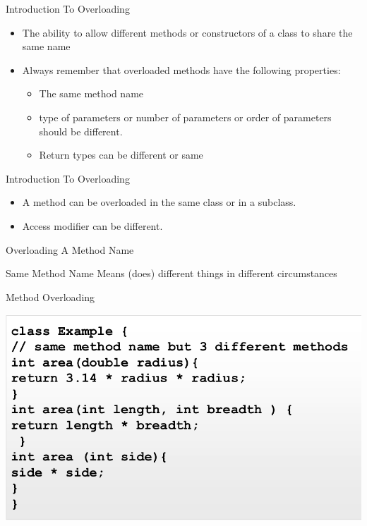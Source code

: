 \documentclass[14pt]{beamer}
\begin{document}
\begin{frame}{Introduction To Overloading}
\begin{itemize}
\item The ability to allow different methods or constructors of a class to share the same name
\item Always remember that overloaded methods have the following properties:
\begin{itemize}
\item The same method name
\item type of parameters or number of parameters or order of parameters should be different.
\item Return types can be different or same
\end{itemize}
\end{itemize}
\end{frame}

\begin{frame}{Introduction To Overloading}
\begin{itemize}
\item A method can be overloaded in the same class or in a subclass.
\item Access modifier can be different.
\end{itemize}
\end{frame}

\begin{frame}{Overloading A Method Name}
\begin{center}
Same Method Name Means (does) different things in different circumstances
\end{center}
\end{frame}


\begin{frame}{Method Overloading}
\begin{center}
    \includegraphics[scale=0.3]{overload1.png}
  \end{center}
 \end{frame}
\end{document}
